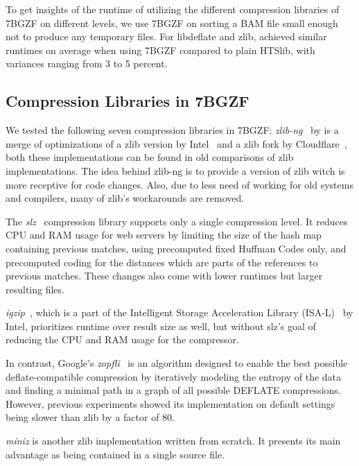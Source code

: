 To get insights of the runtime of \sort utilizing the different compression libraries of 7BGZF on different levels, we use 7BGZF on sorting a BAM file small enough not to produce any temporary files. For libdeflate and zlib, \sort achieved similar runtimes on average when using 7BGZF compared to plain HTSlib, with variances ranging from 3 to 5 percent. 

\subsection{Compression Libraries in 7BGZF}

We tested the following seven compression libraries in 7BGZF:
\textit{zlib-ng}~\cite{noauthor_zlib-ngzlib-ng_2024} by is a merge of optimizations of a zlib version by Intel~\cite{noauthor_intelzlib_2024} and a zlib fork by Cloudflare~\cite{noauthor_cloudflarezlib_2024}, both these implementations can be found in old comparisons of zlib implementations. The idea behind zlib-ng is to provide a version of zlib witch is more receptive for code changes. Also, due to less need of working for old systems and compilers, many of zlib's workarounds are removed. 

The \textit{slz}~\cite{tarreau_wtarreaulibslz_2024} compression library supports only a single compression level. It reduces CPU and RAM usage for web servers by limiting the size of the hash map containing previous matches, using precomputed fixed Huffman Codes only, and precomputed coding for the distances which are parts of the references to previous matches. These changes also come with lower runtimes but larger resulting files. 

\textit{igzip}~\cite{tucker_isa-l_2017}, which is a part of the Intelligent Storage Acceleration Library (ISA-L)~\cite{noauthor_intelisa-l_2024} by Intel, prioritizes runtime over result size as well, but without slz's goal of reducing the CPU and RAM usage for the compressor. 

In contrast, Google's \textit{zopfli}~\cite{noauthor_googlezopfli_2024} is an algorithm designed to enable the best possible deflate-compatible compression by iteratively modeling the entropy of the data and finding a minimal path in a graph of all possible DEFLATE compressions. However, previous experiments showed its implementation on default settings being slower than zlib by a factor of 80. 

\textit{miniz} \cite{noauthor_richgel999miniz_nodate}  is another zlib implementation written from scratch. It presents its main advantage as being contained in a single source file. 


